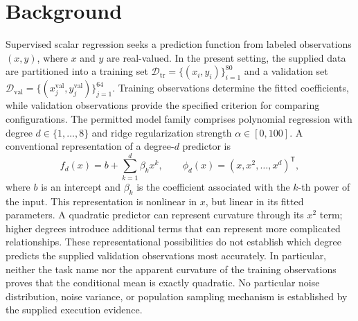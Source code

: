 \documentclass[11pt]{article}
\begin{document}
\section{Background}
Supervised scalar regression seeks a prediction function from labeled observations \((x,y)\), where \(x\) and \(y\) are real-valued. In the present setting, the supplied data are partitioned into a training set \(\mathcal{D}_{\mathrm{tr}}=\{(x_i,y_i)\}_{i=1}^{80}\) and a validation set \(\mathcal{D}_{\mathrm{val}}=\{(x_j^{\mathrm{val}},y_j^{\mathrm{val}})\}_{j=1}^{64}\). Training observations determine the fitted coefficients, while validation observations provide the specified criterion for comparing configurations. The permitted model family comprises polynomial regression with degree \(d\in\{1,\ldots,8\}\) and ridge regularization strength \(\alpha\in[0,100]\). A conventional representation of a degree-\(d\) predictor is
\[
f_{d}(x)=b+\sum_{k=1}^{d}\beta_k x^k,
\qquad
\phi_d(x)=(x,x^2,\ldots,x^d)^{\mathsf T},
\]
where \(b\) is an intercept and \(\beta_k\) is the coefficient associated with the \(k\)-th power of the input. This representation is nonlinear in \(x\), but linear in its fitted parameters. A quadratic predictor can represent curvature through its \(x^2\) term; higher degrees introduce additional terms that can represent more complicated relationships. These representational possibilities do not establish which degree predicts the supplied validation observations most accurately. In particular, neither the task name nor the apparent curvature of the training observations proves that the conditional mean is exactly quadratic. No particular noise distribution, noise variance, or population sampling mechanism is established by the supplied execution evidence.
\end{document}
